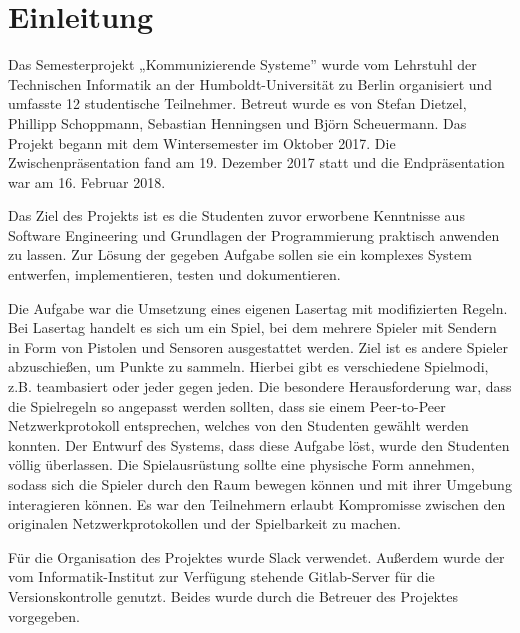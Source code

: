 \section{Einleitung}

Das Semesterprojekt „Kommunizierende Systeme” wurde vom Lehrstuhl der Technischen Informatik an der
Humboldt-Universität zu Berlin organisiert und umfasste 12 studentische Teilnehmer.
Betreut wurde es von Stefan Dietzel, Phillipp Schoppmann, Sebastian Henningsen und Björn
Scheuermann.
Das Projekt begann mit dem Wintersemester im Oktober 2017.
Die Zwischenpräsentation fand am 19. Dezember 2017 statt und die Endpräsentation war am
16. Februar 2018.

Das Ziel des Projekts ist es die Studenten zuvor erworbene Kenntnisse aus
Software Engineering und Grundlagen der Programmierung praktisch anwenden zu
lassen. Zur Lösung der gegeben Aufgabe sollen sie ein komplexes System
entwerfen, implementieren, testen und dokumentieren.

Die Aufgabe war die Umsetzung eines eigenen Lasertag mit modifizierten Regeln.
Bei Lasertag handelt es sich um ein Spiel, bei dem mehrere Spieler mit Sendern
in Form von Pistolen und Sensoren ausgestattet werden. Ziel ist es andere
Spieler abzuschießen, um Punkte zu sammeln. Hierbei gibt es verschiedene
Spielmodi, z.B. teambasiert oder jeder gegen jeden. Die besondere Herausforderung
war, dass die Spielregeln so angepasst werden sollten, dass sie einem Peer-to-Peer
Netzwerkprotokoll entsprechen, welches von den Studenten gewählt werden konnten.
Der Entwurf des Systems, dass diese Aufgabe löst, wurde den Studenten völlig
überlassen. Die Spielausrüstung sollte eine physische Form annehmen, sodass
sich die Spieler durch den Raum bewegen können und mit ihrer Umgebung
interagieren können. Es war den Teilnehmern erlaubt Kompromisse zwischen den
originalen Netzwerkprotokollen und der Spielbarkeit zu machen.

Für die Organisation des Projektes wurde Slack verwendet.
Außerdem wurde der vom Informatik-Institut zur Verfügung stehende Gitlab-Server für die
Versionskontrolle genutzt.
Beides wurde durch die Betreuer des Projektes vorgegeben.
